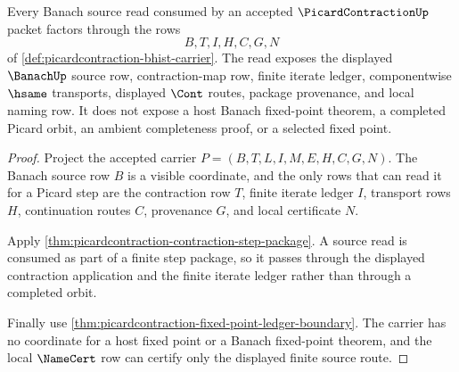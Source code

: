 \begin{theorem}
\label{thm:picardcontraction-banach-source-readback}
Every Banach source read consumed by an accepted $\PicardContractionUp$ packet factors through the rows
$$
B,T,I,H,C,G,N
$$
of \autoref{def:picardcontraction-bhist-carrier}. The read exposes the displayed $\BanachUp$ source row, contraction-map row, finite iterate ledger, componentwise $\hsame$ transports, displayed $\Cont$ routes, package provenance, and local naming row. It does not expose a host Banach fixed-point theorem, a completed Picard orbit, an ambient completeness proof, or a selected fixed point.
\end{theorem}
\begin{proof}
Project the accepted carrier $P=(B,T,L,I,M,E,H,C,G,N)$. The Banach source row $B$ is a visible coordinate, and the only rows that can read it for a Picard step are the contraction row $T$, finite iterate ledger $I$, transport rows $H$, continuation routes $C$, provenance $G$, and local certificate $N$.

Apply \autoref{thm:picardcontraction-contraction-step-package}. A source read is consumed as part of a finite step package, so it passes through the displayed contraction application and the finite iterate ledger rather than through a completed orbit.

Finally use \autoref{thm:picardcontraction-fixed-point-ledger-boundary}. The carrier has no coordinate for a host fixed point or a Banach fixed-point theorem, and the local $\NameCert$ row can certify only the displayed finite source route.
\end{proof}

